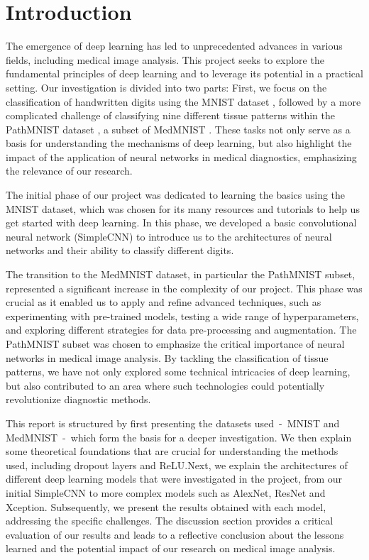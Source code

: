 \section{Introduction}\label{intro}


The emergence of deep learning has led to unprecedented advances in various fields, including medical image analysis. This project seeks to explore the fundamental principles of deep learning and to leverage its potential in a practical setting. Our investigation is divided into two parts: First, we focus on the classification of handwritten digits using the MNIST dataset \citep{deng2012mnist}, followed by a more complicated challenge of classifying nine different tissue patterns within the PathMNIST dataset \citep{kather2018, kather2019}, a subset of MedMNIST \citep{medmnistv1}. These tasks not only serve as a basis for understanding the mechanisms of deep learning, but also highlight the impact of the application of neural networks in medical diagnostics, emphasizing the relevance of our research.

The initial phase of our project was dedicated to learning the basics using the MNIST dataset, which was chosen for its many resources and tutorials to help us get started with deep learning. In this phase, we developed a basic convolutional neural network (SimpleCNN) to introduce us to the architectures of neural networks and their ability to classify different digits.

The transition to the MedMNIST dataset, in particular the PathMNIST subset, represented a significant increase in the complexity of our project. This phase was crucial as it enabled us to apply and refine advanced techniques, such as experimenting with pre-trained models, testing a wide range of hyperparameters, and exploring different strategies for data pre-processing and augmentation. The PathMNIST subset was chosen to emphasize the critical importance of neural networks in medical image analysis. By tackling the classification of tissue patterns, we have not only explored some technical intricacies of deep learning, but also contributed to an area where such technologies could potentially revolutionize diagnostic methods.

This report is structured by first presenting the datasets used~-~MNIST and MedMNIST~-~which form the basis for a deeper investigation. We then explain some theoretical foundations that are crucial for understanding the methods used, including dropout layers and ReLU.\@ Next, we explain the architectures of different deep learning models that were investigated in the project, from our initial SimpleCNN to more complex models such as AlexNet, ResNet and Xception. Subsequently, we present the results obtained with each model, addressing the specific challenges. The discussion section provides a critical evaluation of our results and leads to a reflective conclusion about the lessons learned and the potential impact of our research on medical image analysis.
